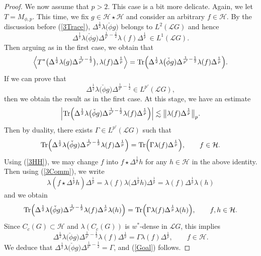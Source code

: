 \documentclass[12pt]{amsart}
\renewcommand{\H}{\mbox{${\mathcal H}$}}
\newcommand{\bignorm}[1]{\bigl\Vert#1\bigr\Vert}
\theoremstyle{remark}
\theoremstyle{definition}
\numberwithin{equation}{section}
\begin{document}
\begin{proof}
We now assume that $p>2$. This case is a bit more delicate. Again, we let $T=M_{\phi,p}$. 
This time, we fix $g\in\H\star \H$
and consider an arbitrary  $f\in \H$. 
By the discussion before (\ref{3Trace}),
$\Delta^{\frac12}\lambda\bigl(\check{\phi}g)$
belongs to $L^2({\mathcal L}G)$ and hence
$$
\Delta^{\frac12}\lambda\bigl(\check{\phi}g)\Delta^{\frac{1}{p'}-\frac12}\lambda(f)\Delta^{\frac{1}{p}}\,\in L^1({\mathcal L}G).
$$
Then arguing as in the first case, we obtain that 
$$
\Bigl\langle T^*\bigl(\Delta^{\frac12}\lambda(g)\Delta^{\frac{1}{p'}-\frac12}\bigr),
\lambda(f)\Delta^{\frac{1}{p}}\Bigr\rangle=
{\rm Tr}\Bigl(\Delta^{\frac12}\lambda\bigl(\check{\phi}g)\Delta^{\frac{1}{p'}-\frac12}\lambda(f)\Delta^{\frac{1}{p}}\Bigr).
$$
If we can prove that 
\begin{equation}\label{Goal}
\Delta^{\frac12}\lambda\bigl(\check{\phi}g)\Delta^{\frac{1}{p'}-\frac12}\in L^{p'}({\mathcal L}G),
\end{equation}
then we obtain the result as in the first case. At this stage, we have an estimate
$$
\Bigl\vert 
{\rm Tr}\Bigl(\Delta^{\frac12}\lambda\bigl(\check{\phi}g)
\Delta^{\frac{1}{p'}-\frac12}\lambda(f)\Delta^{\frac{1}{p}}\Bigr)\Bigr\vert
\lesssim \bignorm{\lambda(f)\Delta^{\frac{1}{p}}}_p.
$$
Then by duality, there exists $\Gamma\in L^{p'}({\mathcal L}G)$ such that 
$$
{\rm Tr}\Bigl(\Delta^{\frac12}\lambda\bigl(\check{\phi}g)\Delta^{\frac{1}{p'}-\frac12}\lambda(f)\Delta^{\frac{1}{p}}\Bigr)
={\rm Tr}\Bigl(\Gamma\lambda(f)\Delta^{\frac{1}{p}}\Bigr),\qquad f\in \H.
$$
Using (\ref{3HH}), we may change $f$ into $f\star \Delta^{\frac{1}{p}}h$  for any $h\in\H$ in the above identity.
Then using  (\ref{3Comm}), we write
$$
\lambda(f\star \Delta^{\frac{1}{p}}h)
\Delta^{\frac{1}{p}}
=\lambda(f)\lambda\bigl(\Delta^{\frac{1}{p}}h\bigr)\Delta^{\frac{1}{p}}
=\lambda(f)\Delta^{\frac{1}{p}}\lambda(h)
$$ 
and we obtain
$$
{\rm Tr}\Bigl(\Delta^{\frac12}\lambda\bigl(\check{\phi}g)
\Delta^{\frac{1}{p'}-\frac12}\lambda(f)\Delta^{\frac{1}{p}}\lambda(h)\Bigr)
={\rm Tr}\Bigl(\Gamma\lambda(f)\Delta^{\frac{1}{p}}\lambda(h)\Bigr),\qquad f,h\in \H.
$$
Since $C_c(G)\subset \H$ and $\lambda(C_c(G))$ is $w^*$-dense in ${\mathcal L}G$,
this implies
$$
\Delta^{\frac12}\lambda\bigl(\check{\phi}g)
\Delta^{\frac{1}{p'}-\frac12}\lambda(f)\Delta^{\frac{1}{p}}
=\Gamma\lambda(f)\Delta^{\frac{1}{p}},\qquad f\in\H.
$$
We deduce  that $\Delta^{\frac12}\lambda\bigl(\check{\phi}g)\Delta^{\frac{1}{p'}-\frac12}=\Gamma$, and (\ref{Goal}) follows.
\end{proof}
\end{document}
